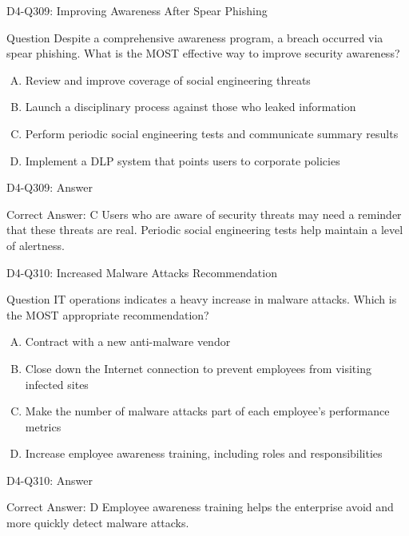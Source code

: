 \documentclass{beamer}
\begin{document}
	\begin{frame}{D4-Q309: Improving Awareness After Spear Phishing}
		\begin{block}{Question}
			Despite a comprehensive awareness program, a breach occurred via spear phishing. What is the MOST effective way to improve security awareness?
		\end{block}
		\begin{enumerate}[(A)]
			\item Review and improve coverage of social engineering threats
			\item Launch a disciplinary process against those who leaked information
			\item Perform periodic social engineering tests and communicate summary results
			\item Implement a DLP system that points users to corporate policies
		\end{enumerate}
	\end{frame}
	\begin{frame}{D4-Q309: Answer}
		\begin{block}{Correct Answer: C}
			Users who are aware of security threats may need a reminder that these threats are real. Periodic social engineering tests help maintain a level of alertness.
		\end{block}
	\end{frame}
	
	\begin{frame}{D4-Q310: Increased Malware Attacks Recommendation}
		\begin{block}{Question}
			IT operations indicates a heavy increase in malware attacks. Which is the MOST appropriate recommendation?
		\end{block}
		\begin{enumerate}[(A)]
			\item Contract with a new anti-malware vendor
			\item Close down the Internet connection to prevent employees from visiting infected sites
			\item Make the number of malware attacks part of each employee's performance metrics
			\item Increase employee awareness training, including roles and responsibilities
		\end{enumerate}
	\end{frame}
	\begin{frame}{D4-Q310: Answer}
		\begin{block}{Correct Answer: D}
			Employee awareness training helps the enterprise avoid and more quickly detect malware attacks.
		\end{block}
	\end{frame}
	
\end{document}
